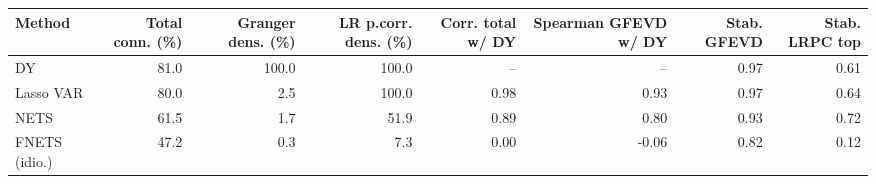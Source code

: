 \begin{tabular}{lrrrrrrr}
\toprule
Method & Total conn. (\%) & Granger dens. (\%) & LR p.corr. dens. (\%) & Corr. total w/ DY & Spearman GFEVD w/ DY & Stab. GFEVD & Stab. LRPC top \\
\midrule
DY & 81.0 & 100.0 & 100.0 & -- & -- & 0.97 & 0.61 \\
Lasso VAR & 80.0 & 2.5 & 100.0 & 0.98 & 0.93 & 0.97 & 0.64 \\
NETS & 61.5 & 1.7 & 51.9 & 0.89 & 0.80 & 0.93 & 0.72 \\
FNETS (idio.) & 47.2 & 0.3 & 7.3 & 0.00 & -0.06 & 0.82 & 0.12 \\
\bottomrule
\end{tabular}

